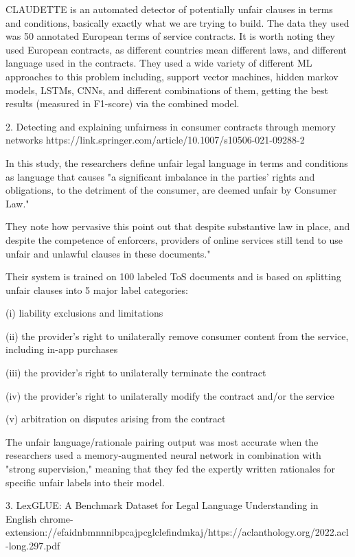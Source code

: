 \documentclass[11pt,a4paper]{article}
\begin{document}
CLAUDETTE is an automated detector of potentially unfair clauses in terms and conditions, basically exactly what we are trying to build. The data they used was 50 annotated European terms of service contracts. It is worth noting they used European contracts, as different countries mean different laws, and different language used in the contracts. They used a wide variety of different ML approaches to this problem including, support vector machines, hidden markov models, LSTMs, CNNs, and different combinations of them, getting the best results (measured in F1-score) via the combined model.  

2. Detecting and explaining unfairness in consumer contracts through memory networks
https://link.springer.com/article/10.1007/s10506-021-09288-2

In this study, the researchers define unfair legal language in terms and conditions as language that causes "a significant imbalance in the parties' rights and obligations, to the detriment of the consumer, are deemed unfair by Consumer Law."

They note how pervasive this point out that despite substantive law in place, and despite the competence of enforcers, providers of online services still tend to use unfair and unlawful clauses in these documents."

Their system is trained on 100 labeled ToS documents and is based on splitting unfair clauses into 5 major label categories:

(i) liability exclusions and limitations

(ii) the provider’s right to unilaterally remove consumer content from the service, including in-app purchases

(iii) the provider’s right to unilaterally terminate the contract

(iv) the provider’s right to unilaterally modify the contract and/or the service

(v) arbitration on disputes arising from the contract

The unfair language/rationale pairing output was most accurate when the researchers used a memory-augmented neural network in combination with "strong supervision," meaning that they fed the expertly written rationales for specific unfair labels into their model.

3. LexGLUE: A Benchmark Dataset for Legal Language Understanding in English
chrome-extension://efaidnbmnnnibpcajpcglclefindmkaj/https://aclanthology.org/2022.acl-long.297.pdf
\end{document}
